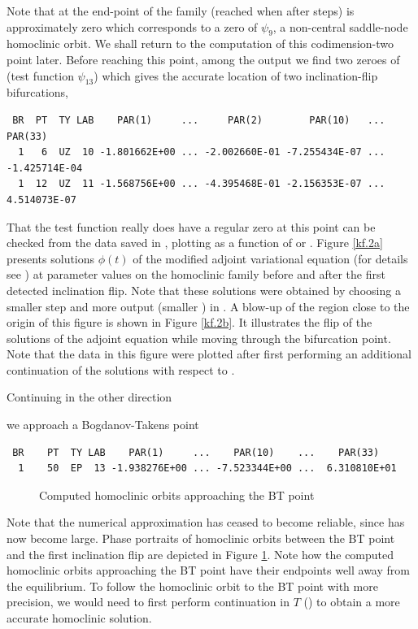 \documentclass[12pt]{report}
\begin{document}
Note that at the end-point of
the family (reached when after  steps)  is
approximately zero which corresponds to a zero of $\psi_9$, a 
non-central saddle-node homoclinic orbit. We shall return to the computation of
this codimension-two point later. Before reaching this point,
among the output we find two zeroes of 
(test function $\psi_{13}$) which gives the accurate
location of two inclination-flip bifurcations,
\begin{verbatim}
 BR  PT  TY LAB    PAR(1)     ...     PAR(2)        PAR(10)   ...    PAR(33)  
  1   6  UZ  10 -1.801662E+00 ... -2.002660E-01 -7.255434E-07 ... -1.425714E-04
  1  12  UZ  11 -1.568756E+00 ... -4.395468E-01 -2.156353E-07 ...  4.514073E-07
\end{verbatim}
That the test function really does have a regular zero at this point can
be checked from the data saved in , plotting  as
a function of  or . 
Figure \ref{kf.2a} presents solutions $\phi(t)$ of the modified adjoint 
variational equation (for details see )
at parameter values on the homoclinic 
family before and after the first detected inclination flip. 
Note that these solutions were obtained by choosing a smaller
step  and more output (smaller ) in
.
A blow-up of the region close to the origin of this 
figure is shown in Figure \ref{kf.2b}.
It illustrates the flip of the solutions of the adjoint equation while
moving through the bifurcation point. Note that the data in this
figure were plotted after first performing an additional
continuation of the solutions with respect to . 

Continuing in the other direction 
\begin{center}
\end{center}
we approach a Bogdanov-Takens point
\begin{verbatim}  
 BR    PT  TY LAB    PAR(1)     ...    PAR(10)    ...    PAR(33)    
  1    50  EP  13 -1.938276E+00 ... -7.523344E+00 ...  6.310810E+01
\end{verbatim}
\begin{figure}[t]
\epsfysize 9.0cm
\centerline{}
\caption{Computed homoclinic orbits approaching the BT point}
\label{kp.6}
\end{figure}
Note that the numerical approximation has ceased to become reliable, since 
 has now become large. 
Phase portraits of homoclinic orbits between the BT point and the first
inclination flip 
are depicted in Figure \ref{kp.6}. Note how the computed homoclinic orbits
approaching the BT point have their endpoints well away from the equilibrium.
To follow the homoclinic orbit to 
the BT point with more precision, we would need to first perform continuation 
in $T$ () to obtain a more accurate homoclinic solution.
\end{document}
